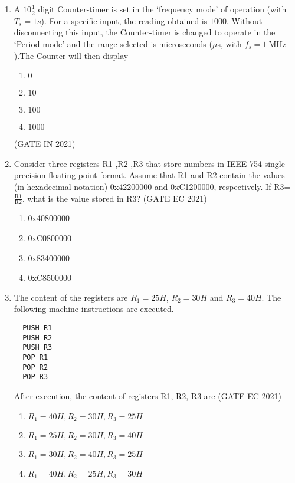 \begin{enumerate}[label=\arabic*.,ref=\theenumi]
\begin{lstlisting}
\end{lstlisting}
%
\item A $10\frac{1}{2}$ digit Counter-timer is set in the `frequency mode' of operation (with $T_s=1s$). For a specific input, the reading obtained is $1000$. Without disconnecting this input, the Counter-timer is changed to operate in the `Period mode' and the range selected is microseconds ($\mu$s, with $f_s=\SI{1}{\mega\hertz}$).The Counter will then display
\begin{enumerate}
  \item $0$
  \item $10$
  \item $100$
  \item $1000$
\end{enumerate}
\hfill(GATE IN 2021)

\item Consider three registers R1 ,R2 ,R3 that store numbers in  IEEE-754  single precision floating point format. Assume that R1 and R2 contain the values (in hexadecimal notation) 0x42200000 and 0xC1200000, respectively. If  R3=$\frac{\text{R1}}{\text{R2}}$, what is the value stored in R3?
\hfill(GATE EC 2021)
\begin{enumerate}
    \item 0x40800000
    \item 0xC0800000
    \item 0x83400000
    \item 0xC8500000
\end{enumerate}
%
\item The content of the registers are $R_1 = 25H$, $R_2 = 30H$ and $R_3 = 40H$. The following machine instructions are executed.
	\begin{lstlisting}
  PUSH R1  
  PUSH R2
  PUSH R3 
  POP R1 
  POP R2 
  POP R3 
\end{lstlisting}
%
After execution, the content of registers R1, R2, R3 are
\hfill(GATE EC 2021)
%
\begin{enumerate}
    \item $R_1 = 40H, R_2 = 30H,R_3 = 25H$
    \item $R_1 = 25H, R_2 = 30H,R_3 = 40H$
    \item $R_1 = 30H, R_2 = 40H,R_3 = 25H$
    \item $R_1 = 40H, R_2 = 25H,R_3 = 30H$
\end{enumerate}
\end{enumerate}
